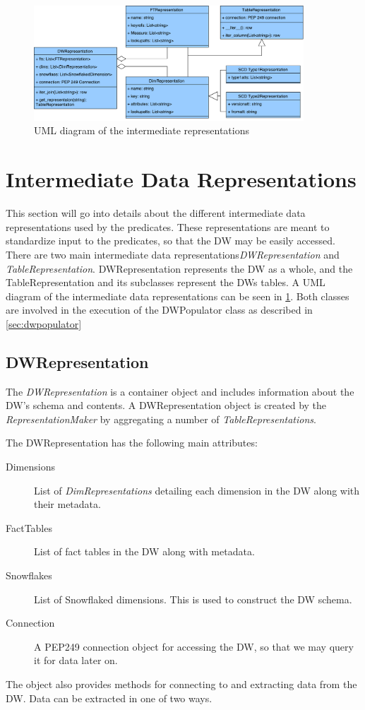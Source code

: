 \begin{figure}
\centering
\includegraphics[width=0.9\textwidth]{figures/dwrep_uml.pdf}
\caption{UML diagram of the intermediate representations}
\label{fig:dwrep}
\end{figure}

\section{Intermediate Data Representations}\label{sect:interdatarep}

This section will go into details about the different intermediate data representations used by the predicates. These representations are meant to standardize input to the predicates, so that the DW may be easily accessed. There are two main intermediate data representations\textit{DWRepresentation} and \textit{TableRepresentation}. DWRepresentation represents the DW as a whole, and the TableRepresentation and its subclasses represent the DWs tables. A UML diagram of the intermediate data representations can be seen in \cref{fig:dwrep}. Both classes are involved in the execution of the DWPopulator class as described in \cref{sec:dwpopulator}

\subsection{DWRepresentation}
The \textit{DWRepresentation} is a container object and includes information about the DW's schema and contents. A DWRepresentation object is created by the \textit{RepresentationMaker} by aggregating a number of \textit{TableRepresentations}.

The DWRepresentation has the following main attributes:

\begin{description}
\item[Dimensions] List of \textit{DimRepresentations} detailing each dimension in the DW along with their metadata.
\item[FactTables] List of fact tables in the DW along with metadata.
\item[Snowflakes] List of Snowflaked dimensions. This is used to construct the DW schema.
\item[Connection] A PEP249 connection object for accessing the DW, so that we may query it for data later on.
\end{description}
The object also provides methods for connecting to and extracting data from the DW. Data can be extracted in one of two ways.

